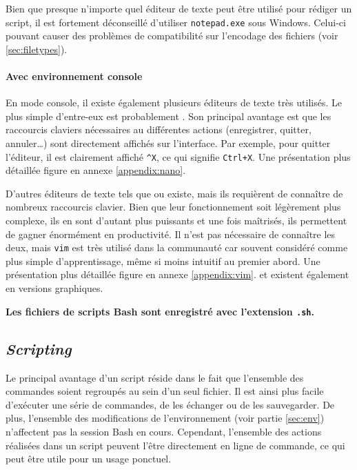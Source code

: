  Bien que presque n'importe quel éditeur de texte peut être utilisé pour rédiger un script, il est fortement déconseillé d'utiliser \texttt{notepad.exe} sous Windows. Celui-ci pouvant causer des problèmes de compatibilité sur l'encodage des fichiers (voir \ref{sec:filetypes}).

\paragraph{Avec environnement console}

En mode console, il existe également plusieurs éditeurs de texte très utilisés. Le plus simple d'entre-eux est probablement . Son principal avantage est que les raccourcis claviers nécessaires au différentes actions (enregistrer, quitter, annuler\dots) sont directement affichés sur l'interface. Par exemple, pour quitter l'éditeur, il est clairement affiché \texttt{\string^X}, ce qui signifie \texttt{Ctrl+X}. Une présentation plus détaillée figure en annexe \ref{appendix:nano}.

D'autres éditeurs de texte tels que  ou  existe, mais ils requièrent de connaître de nombreux raccourcis clavier. Bien que leur fonctionnement soit légèrement plus complexe, ils en sont d'autant plus puissants et une fois maîtrisés, ils permettent de gagner énormément en productivité. Il n'est pas nécessaire de connaître les deux, mais \texttt{vim} est très utilisé dans la communauté car souvent considéré comme plus simple d'apprentissage, même si moins intuitif au premier abord. Une présentation plus détaillée figure en annexe \ref{appendix:vim}.  et  existent également en versions graphiques.

\begin{nscenter}
    \textbf{Les fichiers de scripts Bash sont enregistré avec l'extension \texttt{.sh}.}
\end{nscenter}

\subsection{\textit{Scripting}}

Le principal avantage d'un script réside dans le fait que l'ensemble des commandes soient regroupés au sein d'un seul fichier. Il est ainsi plus facile d'exécuter une série de commandes, de les échanger ou de les sauvegarder. De plus, l'ensemble des modifications de l'environnement (voir partie \ref{sec:env}) n'affectent pas la session Bash en cours. Cependant, l'ensemble des actions réalisées dans un script peuvent l'être directement en ligne de commande, ce qui peut être utile pour un usage ponctuel.

